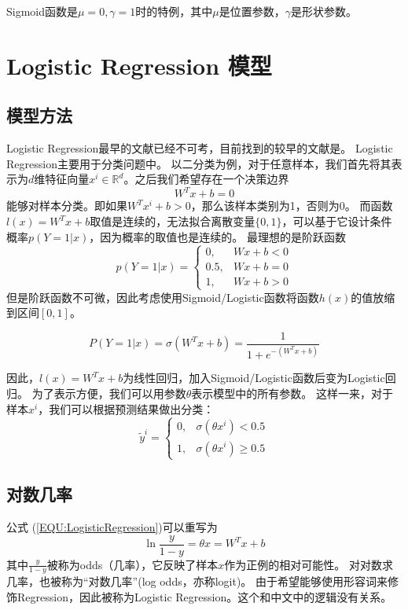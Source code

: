 \documentclass{article}
\begin{document}
Sigmoid函数是$\mu=0, \gamma = 1$时的特例，其中$\mu$是位置参数，$\gamma$是形状参数。

\section{Logistic Regression 模型}

\subsection{模型方法}
Logistic Regression最早的文献已经不可考，目前找到的较早的文献是\cite{efron1975efficiency}。
Logistic Regression主要用于分类问题中。
以二分类为例，对于任意样本，我们首先将其表示为$d$维特征向量$x^i \in \mathbb{R}^d$。之后我们希望存在一个决策边界
\begin{equation}
    W^T x +b = 0
\end{equation}
能够对样本分类。即如果$W^T x^i+b>0$，那么该样本类别为1，否则为0。
而函数$l(x)=W^T x+b$取值是连续的，无法拟合离散变量$\{0,1\}$，可以基于它设计条件概率$p(Y=1|x)$，因为概率的取值也是连续的。
最理想的是阶跃函数
\begin{equation}
    p(Y = 1|x) = \begin{cases}
        0,& Wx+b<0\\
        0.5,& Wx+b=0\\
        1,& Wx+b>0
    \end{cases}
\end{equation}
但是阶跃函数不可微，因此考虑使用Sigmoid/Logistic函数将函数$h(x)$的值放缩到区间$\left[0,1\right]$。

\begin{equation}
    P(Y=1|x) = \sigma(W^T x+b) = \frac{1}{1+e^{-(W^T x+b)}}
    \label{EQU:LogisticRegression}
\end{equation}

因此，$l(x) = W^T x +b$为线性回归，加入Sigmoid/Logistic函数后变为Logistic回归。
为了表示方便，我们可以用参数$\theta$表示模型中的所有参数。
这样一来，对于样本$x^i$，我们可以根据预测结果做出分类：
\begin{equation}
    \tilde{y}^i = \begin{cases}
        0,& \sigma(\theta x^i) <0.5 \\
        1,& \sigma(\theta x^i)\ge 0.5
    \end{cases}
\end{equation}


\subsection{对数几率}
公式 (\ref{EQU:LogisticRegression})可以重写为
\begin{equation}
    \ln \frac{y}{1-y} = \theta x = W^T x + b
\end{equation}
其中$\frac{y}{1-y}$被称为odds（几率），它反映了样本$x$作为正例的相对可能性。
对对数求几率，也被称为``对数几率''(log odds，亦称logit)。
由于希望能够使用形容词来修饰Regression，因此被称为Logistic Regression。这个和中文中的逻辑没有关系。
\end{document}
